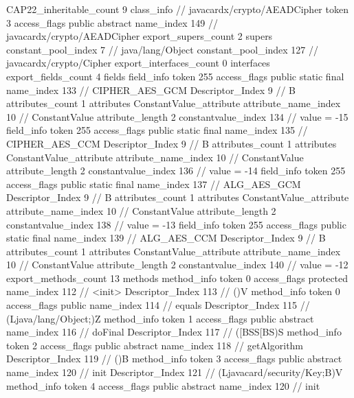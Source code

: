 {{{{{				}
			}
			CAP22_inheritable_count	9
		}
		class_info {		// javacardx/crypto/AEADCipher
			token	3
			access_flags	public abstract
			name_index	149		// javacardx/crypto/AEADCipher
			export_supers_count	2
			supers {
				constant_pool_index	7		// java/lang/Object
				constant_pool_index	127		// javacardx/crypto/Cipher
			}
			export_interfaces_count	0
			interfaces {
			}
			export_fields_count	4
			fields {
			field_info {
				token	255
				access_flags	public static final
				name_index	133		// CIPHER_AES_GCM
				Descriptor_Index	9		// B
				attributes_count	1
				attributes {
				ConstantValue_attribute {
					attribute_name_index	10		// ConstantValue
					attribute_length	2
					constantvalue_index	134		// value = -15
				}
				}
			}
			field_info {
				token	255
				access_flags	public static final
				name_index	135		// CIPHER_AES_CCM
				Descriptor_Index	9		// B
				attributes_count	1
				attributes {
				ConstantValue_attribute {
					attribute_name_index	10		// ConstantValue
					attribute_length	2
					constantvalue_index	136		// value = -14
				}
				}
			}
			field_info {
				token	255
				access_flags	public static final
				name_index	137		// ALG_AES_GCM
				Descriptor_Index	9		// B
				attributes_count	1
				attributes {
				ConstantValue_attribute {
					attribute_name_index	10		// ConstantValue
					attribute_length	2
					constantvalue_index	138		// value = -13
				}
				}
			}
			field_info {
				token	255
				access_flags	public static final
				name_index	139		// ALG_AES_CCM
				Descriptor_Index	9		// B
				attributes_count	1
				attributes {
				ConstantValue_attribute {
					attribute_name_index	10		// ConstantValue
					attribute_length	2
					constantvalue_index	140		// value = -12
				}
				}
			}
			}
			export_methods_count	13
			methods {
				method_info {
					token	0
					access_flags	protected
					name_index	112		// <init>
					Descriptor_Index	113		// ()V
				}
				method_info {
					token	0
					access_flags	public
					name_index	114		// equals
					Descriptor_Index	115		// (Ljava/lang/Object;)Z
				}
				method_info {
					token	1
					access_flags	public abstract
					name_index	116		// doFinal
					Descriptor_Index	117		// ([BSS[BS)S
				}
				method_info {
					token	2
					access_flags	public abstract
					name_index	118		// getAlgorithm
					Descriptor_Index	119		// ()B
				}
				method_info {
					token	3
					access_flags	public abstract
					name_index	120		// init
					Descriptor_Index	121		// (Ljavacard/security/Key;B)V
				}
				method_info {
					token	4
					access_flags	public abstract
					name_index	120		// init
}}}}}
